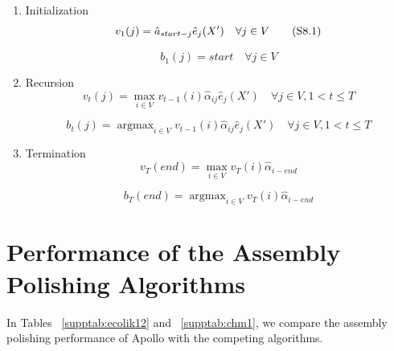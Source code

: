 \documentclass[a4paper]{article}
\DeclareMathOperator*{\argmax}{argmax}
\begin{document}
\begin{enumerate}
\item Initialization
\begin{equation}
v_{1}(j) = \hat{a}_{start-j}\hat{e}_{j}(X') \quad \forall j \in V \tag{S8.1} \label{suppeq:vitinitial} \\
\end{equation}

\begin{equation}
b_{1}(j) = start \tag{S8.2} 
\quad \forall j \in V \label{suppeq:backtraceinitial}
\end{equation}

\item Recursion
\begin{equation}
v_{t}(j) = \max_{i \in V} v_{t-1}(i)\hat{\alpha}_{ij}\hat{e}_{j}(X') \quad \forall j \in V, 1 < t \leq T \tag{S8.3} \label{suppeq:vitrec}
\end{equation}

\begin{equation}
b_{t}(j) = \argmax_{i \in V} v_{t-1}(i)\hat{\alpha}_{ij}\hat{e}_{j}(X') \quad \forall j \in V, 1 < t \leq T  \tag{S8.4} \label{suppeq:backtracerec}
\end{equation}

\item Termination
\begin{equation}
v_{T}(end) = \max_{i \in V} v_{T}(i)\hat{\alpha}_{i-end} \tag{S8.5} \label{suppeq:vitterm}
\end{equation}

\begin{equation}
b_{T}(end) = \argmax_{i \in V} v_{T}(i)\hat{\alpha}_{i-end} \tag{S8.6} \label{suppeq:backtraceterm}
\end{equation}
\end{enumerate}

\clearpage

\section{Performance of the Assembly Polishing Algorithms}

In Tables ~\ref{supptab:ecolik12} and ~\ref{supptab:chm1}, we compare the assembly polishing performance of Apollo with the competing algorithms.
\end{document}
